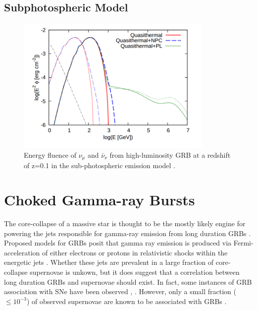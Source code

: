 \documentclass{gatech-thesis}
\begin{document}
\subsection{Subphotospheric Model}

\begin{figure}[ht]
  \begin{center}
    \includegraphics[width=0.85\textwidth,keepaspectratio]{SubPhotoFluence.png}
  \end{center}
  \caption{Energy fluence of $\nu_{\mu}$ and $\bar{\nu}_{\nu}$ from high-luminosity GRB at a redshift of z=0.1 in the sub-photospheric emission model \cite{2013PhRvL.111m1102M}.}
  \label{fig:subphotospheric_nus}
\end{figure}


\section{Choked Gamma-ray Bursts}
The core-collapse of a massive star is thought to be the mostly likely engine for powering the jets responsible for gamma-ray emission from long duration GRBs \cite{2004RvMP...76.1143P}. Proposed models for GRBs posit that gamma ray emission is produced via Fermi-acceleration of either electrons or protons in relativistic shocks within the energetic jets \cite{2004IJMPA..19.2385Z}. Whether these jets are prevalent in a large fraction of core-collapse supernovae is unkown, but it does suggest that a correlation between long duration GRBs and supernovae should exist. In fact, some instances of GRB association with SNe have been observed \cite{2006ARA&A..44..507W}, \cite{2011AN....332..434M} \cite{2003astro.ph..1006H}. However, only a small fraction ($\leq 10^{-3}$) of observed supernovae are known to be associated with GRBs \cite{2003ApJ...599..408B}. 
\end{document}

